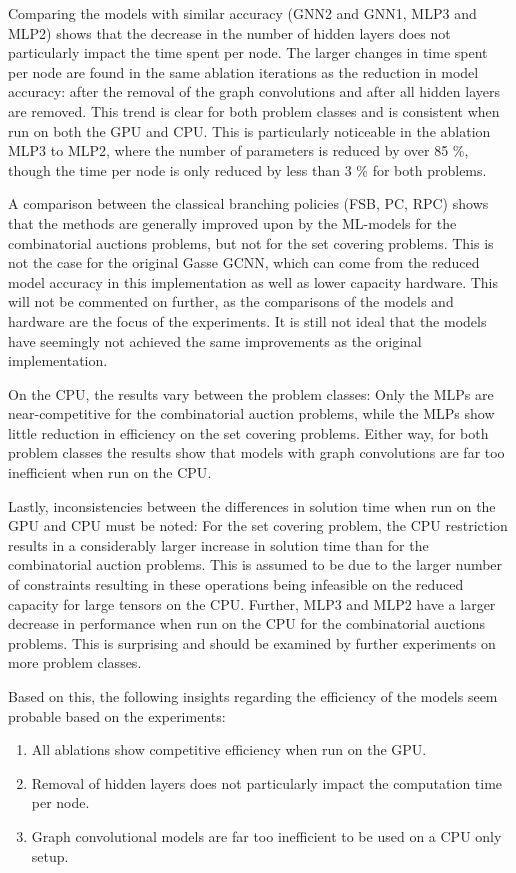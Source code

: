 Comparing the models with similar accuracy (GNN2 and GNN1, MLP3 and MLP2) shows that the decrease in the number of hidden layers does not particularly impact the time spent per node.  The larger changes in time spent per node are found in the same ablation iterations as the reduction in model accuracy: after the removal of the graph convolutions and after all hidden layers are removed. This trend is clear for both problem classes and is consistent when run on both the \gls{GPU} and \gls{CPU}. 
This is particularly noticeable in the ablation MLP3 to MLP2, where the number of parameters is reduced by over 85 \%, though the time per node is only reduced by less than 3 \% for both problems.

A comparison between the classical branching policies (\gls{FSB}, \gls{PC}, \gls{RPC}) shows that the methods are generally improved upon by the \gls{ML}-models for the combinatorial auctions problems, but not for the set covering problems. This is not the case for the original Gasse GCNN, which can come from the reduced model accuracy in this implementation as well as lower capacity hardware. This will not be commented on further, as the comparisons of the models and hardware are the focus of the experiments.
It is still not ideal that the models have seemingly not achieved the same improvements as the original implementation.

On the \gls{CPU}, the results vary between the problem classes: Only the \gls{MLP}s are near-competitive for the combinatorial auction problems, while the \gls{MLP}s show little reduction in efficiency on the set covering problems. Either way, for both problem classes the results show that models with graph convolutions are far too inefficient when run on the \gls{CPU}.  

Lastly, inconsistencies between the differences in solution time when run on the \gls{GPU} and \gls{CPU} must be noted: For the set covering problem, the \gls{CPU} restriction results in a considerably larger increase in solution time than for the combinatorial auction problems. This is assumed to be due to the larger number of constraints resulting in these operations being infeasible on the reduced capacity for large tensors on the \gls{CPU}. Further, MLP3 and MLP2 have a larger decrease in performance when run on the \gls{CPU} for the combinatorial auctions problems. This is surprising and should be examined by further experiments on more problem classes. 

Based on this, the following insights regarding the efficiency of the models seem probable based on the experiments:
\begin{enumerate}[label=(\roman*)]
    \item All ablations show competitive efficiency when run on the \gls{GPU}.
    \item Removal of hidden layers does not particularly impact the computation time per node.
    \item Graph convolutional models are far too inefficient to be used on a \gls{CPU} only setup. 
\end{enumerate}






